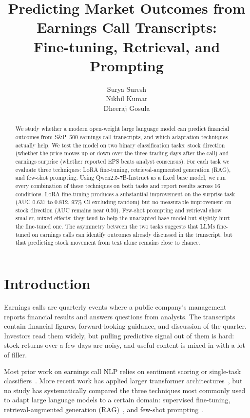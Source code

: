 \documentclass[11pt]{article}
\title{Predicting Market Outcomes from Earnings Call Transcripts:\\
       Fine-tuning, Retrieval, and Prompting}
\author{
Surya Suresh \\
\And
Nikhil Kumar \\
\And
Dheeraj Gosula \\
}
\begin{document}
\maketitle

\begin{abstract}
We study whether a modern open-weight large language model can predict
financial outcomes from S\&P~500 earnings call transcripts, and which
adaptation techniques actually help. We test the model on two binary
classification tasks: stock direction (whether the price moves up or
down over the three trading days after the call) and earnings surprise
(whether reported EPS beats analyst consensus). For each task we
evaluate three techniques: LoRA fine-tuning, retrieval-augmented
generation (RAG), and few-shot prompting. Using Qwen2.5-7B-Instruct as
a fixed base model, we run every combination of these techniques on
both tasks and report results across 16 conditions. LoRA fine-tuning
produces a substantial improvement on the surprise task (AUC 0.637 to
0.812, 95\% CI excluding random) but no measurable improvement on
stock direction (AUC remains near 0.50). Few-shot prompting and
retrieval show smaller, mixed effects: they tend to help the
unadapted base model but slightly hurt the fine-tuned one. The
asymmetry between the two tasks suggests that LLMs fine-tuned on
earnings calls can identify outcomes already discussed in the
transcript, but that predicting stock movement from text alone
remains close to chance.
\end{abstract}

\section{Introduction}

Earnings calls are quarterly events where a public company's
management reports financial results and answers questions from
analysts. The transcripts contain financial figures, forward-looking
guidance, and discussion of the quarter. Investors read them widely,
but pulling predictive signal out of them is hard: stock returns over
a few days are noisy, and useful content is mixed in with a lot of
filler.

Most prior work on earnings call NLP relies on sentiment scoring or
single-task classifiers~\citep{Loughran2011,Araci2019,Qin2019}. More
recent work has applied larger transformer
architectures~\citep{Koval2023,Ma2020}, but no study has systematically
compared the three techniques most commonly used to adapt large
language models to a certain domain: supervised fine-tuning,
retrieval-augmented generation (RAG)~\citep{Lewis2020}, and few-shot
prompting~\citep{Brown2020,Wei2022}.
\end{document}
